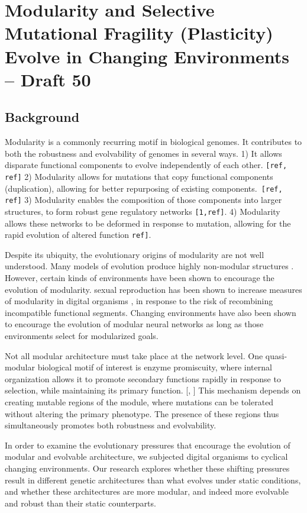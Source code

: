 \section{Modularity and Selective Mutational Fragility (Plasticity) Evolve in Changing Environments  – Draft 50}
\subsection{Background}

Modularity is a commonly recurring motif in biological genomes. It contributes to both the robustness and evolvability of genomes in several ways. 1) It allows disparate functional components to evolve independently of each other. \verb|[ref, ref]| 2) Modularity allows for mutations that copy functional components (duplication), allowing for better repurposing of existing components.\verb| [ref, ref]| 3) Modularity enables the composition of those components into larger structures, to form robust gene regulatory networks \verb|[1,ref]|. 4) Modularity allows these networks to be deformed in response to mutation, allowing for the rapid evolution of altered function \cite{mody_modularity_2009} \verb|ref]|.

Despite its ubiquity, the evolutionary origins of modularity are not well understood. Many models of evolution produce highly non-modular structures \cite{kashtan_spontaneous_2005}. However, certain kinds of environments have been shown to encourage the evolution of modularity. sexual reproduction has been shown to increase measures of modularity in digital organisms \cite{misevic_sexual_2006}, in response to the risk of recombining incompatible functional segments. Changing environments have also been shown to encourage the evolution of modular neural networks \cite{kashtan_spontaneous_2005} as long as those environments select for modularized goals. 

Not all modular architecture must take place at the network level. One quasi-modular biological motif of interest is enzyme promiscuity, where internal organization allows it to promote secondary functions rapidly in response to selection, while maintaining its primary function. [\cite{aharoni_evolvability_2005}, \cite{khersonsky_enzyme_2006}] This mechanism depends on creating mutable regions of the module, where mutations can be tolerated without altering the primary phenotype. The presence of these regions thus simultaneously promotes both robustness and evolvability.

In order to examine the evolutionary pressures that encourage the evolution of modular and evolvable architecture, we subjected digital organisms to cyclical changing environments. Our research explores whether these shifting pressures result in different genetic architectures than what evolves under static conditions, and whether these architectures are more modular, and indeed more evolvable and robust than their static counterparts.